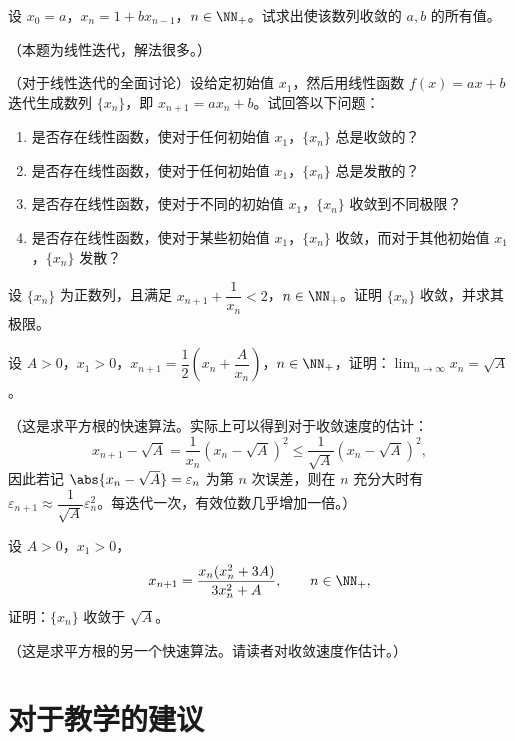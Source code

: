 \begin{xexercise}[5]
设 $x_0=a$，$x_n=1+bx_{n-1}$，$n\in\NN_+$。试求出使该数列收敛的 $a,b$ 的所有值。

  （本题为线性迭代，解法很多。）
\end{xexercise}

\begin{xexercise}[6]
（对于线性迭代的全面讨论）设给定初始值 $x_1$，然后用线性函数 $f(x)=ax+b$ 迭代生成数列 $\{x_n\}$，即 $x_{n+1}=ax_n+b$。试回答以下问题：
  \begin{enumerate}[label=(\arabic*)]
    \item 是否存在线性函数，使对于任何初始值 $x_1$，$\{x_n\}$ 总是收敛的？
    \item 是否存在线性函数，使对于任何初始值 $x_1$，$\{x_n\}$ 总是发散的？
    \item 是否存在线性函数，使对于不同的初始值 $x_1$，$\{x_n\}$ 收敛到不同极限？
    \item 是否存在线性函数，使对于某些初始值 $x_1$，$\{x_n\}$ 收敛，而对于其他初始值 $x_1$，$\{x_n\}$ 发散？
  \end{enumerate}
\end{xexercise}

\begin{xexercise}[7]
设 $\{x_n\}$ 为正数列，且满足 $x_{n+1}+\dfrac1{x_n}<2$，$n\in\NN_+$。证明 $\{x_n\}$ 收敛，并求其极限。
\end{xexercise}

\begin{xexercise}[8]
设 $A>0$，$x_1>0$，$x_{n+1}=\dfrac12\left(x_n+\dfrac A{x_n}\right)$，$n\in\NN_+$，证明：$\displaystyle\lim_{n\to\infty}x_n=\sqrt A$。

  （这是求平方根的快速算法。实际上可以得到对于收敛速度的估计：
  \[
    x_{n+1}-\sqrt A=\frac1{x_n}(x_n-\sqrt A)^2
    \le\frac1{\sqrt A}(x_n-\sqrt A)^2,
  \]
  因此若记 $\abs{x_n-\sqrt A}=\varepsilon_n$ 为第 $n$ 次误差，则在 $n$ 充分大时有 $\varepsilon_{n+1}\approx\dfrac1{\sqrt A}\varepsilon_n^2$。每迭代一次，有效位数几乎增加一倍。）
\end{xexercise}

\begin{xexercise}[9]
设 $A>0$，$x_1>0$，
  \[
    x_{n+1}=\frac{x_n(x_n^2+3A)}{3x_n^2+A},\qquad n\in\NN_+,
  \]
  证明：$\{x_n\}$ 收敛于 $\sqrt A$。

  （这是求平方根的另一个快速算法。请读者对收敛速度作估计。）
\end{xexercise}

\section{对于教学的建议}

